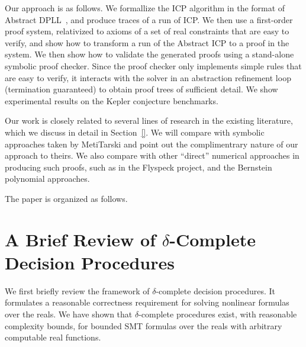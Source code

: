 \documentclass[envcountsect]{llncs}
\begin{document}
Our approach is as follows. We formallize the ICP algorithm in the
format of Abstract DPLL~\cite{}, and produce traces of a run of ICP. We then
use a first-order proof system, relativized to axioms of a set of real
constraints that are easy to verify, and show how to transform a run of the
Abstract ICP to a proof in the system. We then show how to validate the
generated proofs using a stand-alone symbolic proof checker. Since the proof
checker only implements simple rules that are easy to verify, it interacts with
the solver in an abstraction refinement loop (termination guaranteed) to obtain
proof trees of sufficient detail. We show experimental results on the Kepler
conjecture benchmarks. 

Our work is closely related to several lines
of research in the existing literature, which we discuss in detail in
Section~\ref{}. We will compare with symbolic approaches taken by MetiTarski
and point out the complimentrary nature of our approach to theirs. We also
compare with other ``direct'' numerical approaches in producing such proofs,
such as in the Flyspeck project, and the Bernstein polynomial approaches. 

The paper is organized as follows. 


\section{A Brief Review of $\delta$-Complete Decision Procedures}\label{review}

We first briefly review the framework of $\delta$-complete decision procedures.
It formulates a reasonable correctness requirement for solving nonlinear
formulas over the reals. We have shown that $\delta$-complete procedures exist,
with reasonable complexity bounds, for bounded SMT formulas over the reals with
arbitrary computable real functions.
\end{document}
